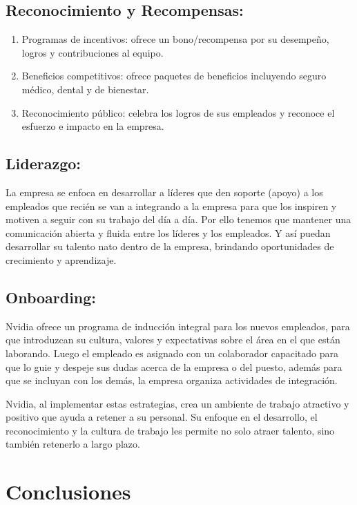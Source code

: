 \documentclass{article}
\begin{document}
\subsection{Reconocimiento y Recompensas:}

\begin{enumerate}
  \item Programas de incentivos: ofrece un bono/recompensa por su desempeño, logros y contribuciones al equipo.
  \item Beneficios competitivos: ofrece paquetes de beneficios incluyendo seguro médico, dental y de bienestar.
  \item Reconocimiento público: celebra los logros de sus empleados y reconoce el esfuerzo e impacto en la empresa.
\end{enumerate}

\subsection{Liderazgo:}

La empresa se enfoca en desarrollar a líderes que den soporte (apoyo) a los empleados que recién se van a integrando a la empresa para que los inspiren y motiven a seguir con su trabajo del día a día. Por ello tenemos que mantener una comunicación abierta y fluida entre los líderes y los empleados. Y así puedan desarrollar su talento nato dentro de la empresa, brindando oportunidades de crecimiento y aprendizaje.

\subsection{Onboarding:}

Nvidia ofrece un programa de inducción integral para los nuevos empleados, para que introduzcan su cultura, valores y expectativas sobre el área en el que están laborando. Luego el empleado es asignado con un colaborador capacitado para que lo guie y despeje sus dudas acerca de la empresa o del puesto, además para que se incluyan con los demás, la empresa organiza actividades de integración.

Nvidia, al implementar estas estrategias, crea un ambiente de trabajo atractivo y positivo que ayuda a retener a su personal. Su enfoque en el desarrollo, el reconocimiento y la cultura de trabajo les permite no solo atraer talento, sino también retenerlo a largo plazo.

\section{Conclusiones}
\end{document}
